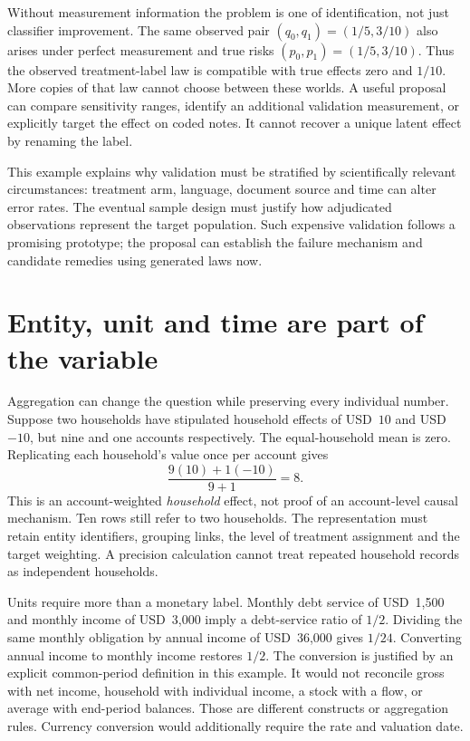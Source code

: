 Without measurement information the problem is one of identification, not
just classifier improvement. The same observed pair
\((q_0,q_1)=(1/5,3/10)\) also arises under perfect measurement and true risks
\((p_0,p_1)=(1/5,3/10)\). Thus the observed treatment-label law is compatible
with true effects zero and \(1/10\). More copies of that law cannot choose
between these worlds. A useful proposal can compare sensitivity ranges,
identify an additional validation measurement, or explicitly target the
effect on coded notes. It cannot recover a unique latent effect by renaming
the label.

This example explains why validation must be stratified by scientifically
relevant circumstances: treatment arm, language, document source and time
can alter error rates. The eventual sample design must justify how
adjudicated observations represent the target population. Such expensive
validation follows a promising prototype; the proposal can establish the
failure mechanism and candidate remedies using generated laws now.

\section{Entity, unit and time are part of the variable}

Aggregation can change the question while preserving every individual number.
Suppose two households have stipulated household effects of USD~\(10\) and
USD~\(-10\), but nine and one accounts respectively. The equal-household mean
is zero. Replicating each household's value once per account gives
\[
 \frac{9(10)+1(-10)}{9+1}=8.
\]
This is an account-weighted \emph{household} effect, not proof of an
account-level causal mechanism. Ten rows still refer to two households.
The representation must retain entity identifiers, grouping links,
the level of treatment assignment and the target weighting. A precision
calculation cannot treat repeated household records as independent households.
\citep{exec17_ontology_oracle}

Units require more than a monetary label. Monthly debt service of
USD~1,500 and monthly income of USD~3,000 imply a debt-service ratio of \(1/2\).
Dividing the same monthly obligation by annual income of USD~36,000 gives
\(1/24\). Converting annual income to monthly income restores \(1/2\).
The conversion is justified by an explicit common-period definition in this
example. It would not reconcile gross with net income, household with
individual income, a stock with a flow, or average with end-period balances.
Those are different constructs or aggregation rules. Currency conversion
would additionally require the rate and valuation date.

